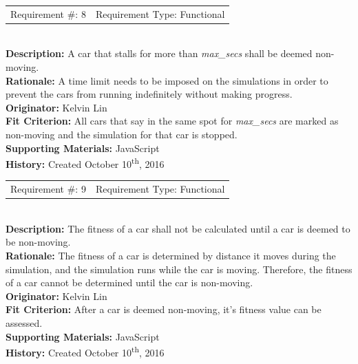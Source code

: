 \documentclass[12pt, titlepage]{article}
\begin{document}
\begin{reqbox}
%
\begin{tabular}{cc}
Requirement \#: 8 & Requirement Type: Functional \\
\end{tabular} \\
%
\textbf{Description:} A car that stalls for more than \textit{max\_secs} shall 
be deemed non-moving. \\
\textbf{Rationale:} A time limit needs to be imposed on the simulations in order 
to prevent the cars from running indefinitely without making progress. \\
\textbf{Originator:} Kelvin Lin\\
\textbf{Fit Criterion:} All cars that say in the same spot for 
\textit{max\_secs} are marked as non-moving and the simulation for that car is 
stopped.\\
%  
\textbf{Supporting Materials:} JavaScript \\
\textbf{History:} Created October 10\textsuperscript{th}, 2016
%
\end{reqbox}

\begin{reqbox}
%
\begin{tabular}{cc}
Requirement \#: 9 & Requirement Type: Functional \\
\end{tabular} \\
%
\textbf{Description:} The fitness of a car shall not be calculated until a car 
is deemed to be non-moving. \\
\textbf{Rationale:} The fitness of a car is determined by distance it moves 
during the simulation, and the simulation runs while the car is moving. 
Therefore, the fitness of a car cannot be determined until the car is 
non-moving. \\
\textbf{Originator:} Kelvin Lin\\
\textbf{Fit Criterion:} After a car is deemed non-moving, it's fitness value can 
be assessed.\\
%  
\textbf{Supporting Materials:} JavaScript \\
\textbf{History:} Created October 10\textsuperscript{th}, 2016
%
\end{reqbox}

\newpage
\end{document}
